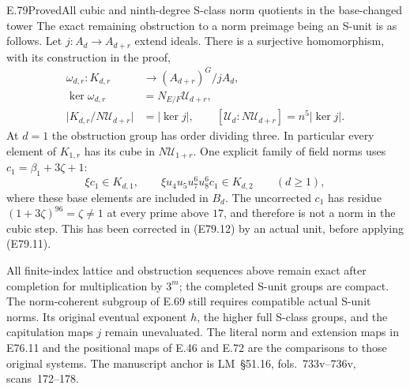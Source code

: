 \begin{statement}{E.79}{Proved}{All cubic and ninth-degree S-class norm quotients in the base-changed tower}
The exact remaining obstruction to a norm preimage being an
S-unit is as follows. Let $j:A_d\to A_{d+r}$ extend ideals.
There is a surjective homomorphism, with its construction in the
proof,
\[
 \begin{split}
 \omega_{d,r}:K_{d,r}&\longrightarrow (A_{d+r})^G/jA_d,\\
 \ker\omega_{d,r}&=N_{E/F}\mathscr U_{d+r},\\
 \bigl|K_{d,r}/N\mathscr U_{d+r}\bigr|
   &=|\ker j|,\qquad
 [\mathscr U_d:N\mathscr U_{d+r}]=n^5|\ker j|.
 \end{split}
 \tag{E79.11}
\]
At $d=1$ the obstruction group has order dividing three.
In particular every element of $K_{1,r}$ has its cube in
$N\mathscr U_{1+r}$. One explicit family of field norms uses
$c_1=\beta_1+3\zeta+1$:
\[
 \xi c_1\in K_{d,1},\qquad
 \xi u_4u_5u_7^6u_8^6c_1\in K_{d,2}\qquad(d\ge1),
 \tag{E79.12}
\]
where these base elements are included in $B_d$.
The uncorrected $c_1$ has residue
$(1+3\zeta)^{96}=\zeta\ne1$ at every prime above $17$,
and therefore is not a norm in the cubic step. This has been
corrected in (E79.12) by an actual unit, before applying
(E79.11).

All finite-index lattice and obstruction sequences above remain
exact after completion for multiplication by $3^m$; the completed
S-unit groups are compact. The norm-coherent subgroup of E.69
still requires compatible actual S-unit norms. Its original
eventual exponent $h$, the higher full S-class groups, and the
capitulation maps $j$ remain unevaluated. The literal norm and
extension maps in E76.11 and the positional maps of E.46 and
E.72 are the comparisons to those original systems. The
manuscript anchor is LM~\S51.16, fols.~733v--736v,
scans~172--178.
\end{statement}

